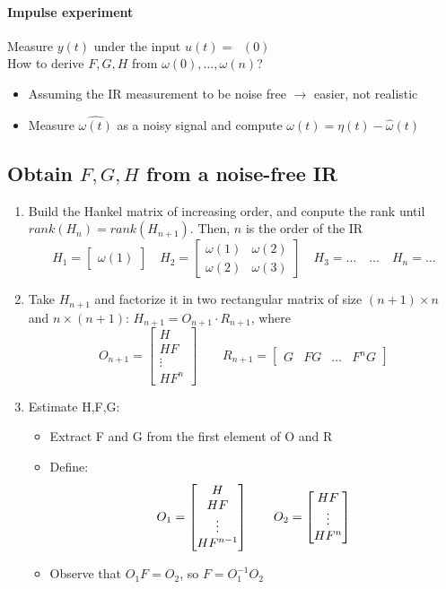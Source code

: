 \documentclass{article}
\DeclareMathOperator{\imp}{impulse(0)}
\begin{document}
\paragraph{Impulse experiment} Measure $y(t)$ under the input $u(t)=\imp (0)$\\
How to derive $F,G,H$ from $\omega(0),\dots,\omega(n)$?
\begin{itemize}
\item Assuming the IR measurement to be noise free $\rightarrow$ easier, not realistic
\item Measure $\hat{\omega(t)}$ as a noisy signal and compute $\omega(t)=\eta(t)-\hat{\omega}(t)$
\end{itemize}

\subsection{Obtain $F,G,H$ from a noise-free IR}
\begin{enumerate}
\item
	Build the Hankel matrix of increasing order, and conpute the rank until $rank(H_n)=rank(H_{n+1})$. Then, $n$ is the order of the IR
	\[
	H_1=\begin{bmatrix}
	\omega(1)
	\end{bmatrix}
	\quad
	H_2=\begin{bmatrix}
	\omega(1)&\omega(2)\\
	\omega(2)&\omega(3)
	\end{bmatrix}
	\quad
	H_3=\dots
	\quad
	\dots
	\quad
	H_n=\dots
	\]
\item Take $H_{n+1}$ and factorize it in two rectangular matrix of size $(n+1)\times n$ and $n\times (n+1)$: $H_{n+1}=O_{n+1}\cdot R_{n+1}$, where
	\[
	O_{n+1}=\begin{bmatrix}
	H\\HF\\\vdots\\HF^n
	\end{bmatrix}
	\qquad
	R_{n+1}=\begin{bmatrix}
	G&FG&\dots&F^nG
	\end{bmatrix}
	\]
\item Estimate H,F,G:
	\begin{itemize}
	\item Extract F and G from the first element of O and R
	\item Define:
	\[
	O_1=\begin{bmatrix}
	H\\HF\\\vdots\\HF^{n-1}
	\end{bmatrix}
	\qquad
	O_2=\begin{bmatrix}
	HF\\\vdots\\HF^n
	\end{bmatrix}\\
	\]
	\item Observe that $O_1F=O_2$, so $F=O_1^{-1}O_2$
	\end{itemize}	
\end{enumerate}
\end{document}
